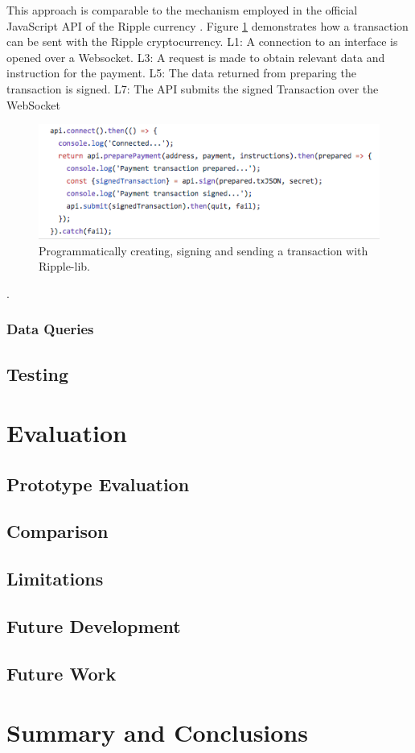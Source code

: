 This approach is comparable to the mechanism employed in the official JavaScript API of the Ripple currency \cite{ripplelib}.
Figure \ref{ripplesendTx} demonstrates how a transaction can be sent with the Ripple cryptocurrency.
L1: A connection to an interface is opened over a Websocket. 
L3: A request is made to obtain relevant data and instruction for the payment.
L5: The data returned from preparing the transaction is signed.
L7: The API submits the signed Transaction over the WebSocket


\begin{figure}
\centering
\includegraphics[width=1\textwidth]{diagrams/ripplelibSendTX.png}
\caption{\label{ripplesendTx}Programmatically creating, signing and sending a transaction with Ripple-lib\cite{ripplelib}.}
\end{figure}.


\subsection{Data Queries}

\section{Testing}


\chapter{Evaluation}
\section{Prototype Evaluation}
\section{Comparison}
\section{Limitations}
\section{Future Development}
\section{Future Work}
\newpage

\chapter{Summary and Conclusions}
